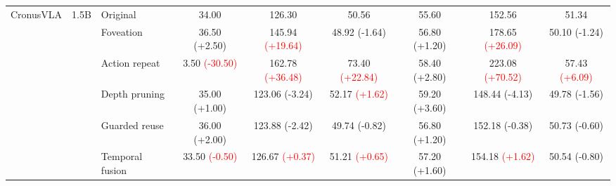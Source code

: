 \begin{table}[t]
\begin{tabular}{cclcccccc}
\multirow[c]{6}{*}{CronusVLA}
& \multirow[c]{6}{*}{1.5B}
& Original & 34.00 & 126.30 & 50.56 & 55.60 & 152.56 & 51.34 \\
& & Foveation & 36.50 {\scriptsize\textcolor{green!50!black}{(+2.50)}} & 145.94 {\scriptsize\textcolor{red}{(+19.64)}} & 48.92 {\scriptsize\textcolor{green!50!black}{(-1.64)}} & 56.80 {\scriptsize\textcolor{green!50!black}{(+1.20)}} & 178.65 {\scriptsize\textcolor{red}{(+26.09)}} & 50.10 {\scriptsize\textcolor{green!50!black}{(-1.24)}} \\
& & Action repeat & 3.50 {\scriptsize\textcolor{red}{(-30.50)}} & 162.78 {\scriptsize\textcolor{red}{(+36.48)}} & 73.40 {\scriptsize\textcolor{red}{(+22.84)}} & 58.40 {\scriptsize\textcolor{green!50!black}{(+2.80)}} & 223.08 {\scriptsize\textcolor{red}{(+70.52)}} & 57.43 {\scriptsize\textcolor{red}{(+6.09)}} \\
& & Depth pruning & 35.00 {\scriptsize\textcolor{green!50!black}{(+1.00)}} & 123.06 {\scriptsize\textcolor{green!50!black}{(-3.24)}} & 52.17 {\scriptsize\textcolor{red}{(+1.62)}} & 59.20 {\scriptsize\textcolor{green!50!black}{(+3.60)}} & 148.44 {\scriptsize\textcolor{green!50!black}{(-4.13)}} & 49.78 {\scriptsize\textcolor{green!50!black}{(-1.56)}} \\
& & Guarded reuse & 36.00 {\scriptsize\textcolor{green!50!black}{(+2.00)}} & 123.88 {\scriptsize\textcolor{green!50!black}{(-2.42)}} & 49.74 {\scriptsize\textcolor{green!50!black}{(-0.82)}} & 56.80 {\scriptsize\textcolor{green!50!black}{(+1.20)}} & 152.18 {\scriptsize\textcolor{green!50!black}{(-0.38)}} & 50.73 {\scriptsize\textcolor{green!50!black}{(-0.60)}} \\
& & Temporal fusion & 33.50 {\scriptsize\textcolor{red}{(-0.50)}} & 126.67 {\scriptsize\textcolor{red}{(+0.37)}} & 51.21 {\scriptsize\textcolor{red}{(+0.65)}} & 57.20 {\scriptsize\textcolor{green!50!black}{(+1.60)}} & 154.18 {\scriptsize\textcolor{red}{(+1.62)}} & 50.54 {\scriptsize\textcolor{green!50!black}{(-0.80)}} \\
\cmidrule(lr){1-9}


\end{tabular}
\end{table}
